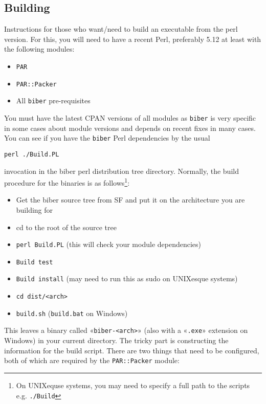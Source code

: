 \documentclass{ltxdockit}
\begin{document}
\subsection{Building}

Instructions for those who want/need to build an executable from the
perl version. For this, you will need to have a recent Perl,
preferably 5.12 at least with the following modules:

\begin{itemize}
\item \verb+PAR+
\item \verb+PAR::Packer+
\item All \verb+biber+ pre-requisites
\end{itemize}

\noindent You must have the latest CPAN versions of all modules as \verb+biber+
is very specific in some cases about module versions and depends on
recent fixes in many cases. You can see if you have the \verb+biber+
Perl dependencies by the usual

\begin{verbatim}
perl ./Build.PL
\end{verbatim}

\noindent invocation in the biber perl distribution tree
directory. Normally, the build procedure for the binaries is as
follows\footnote{On UNIXequse systems, you may need to specify a full
  path to the scripts e.g. \texttt{./Build}}:

\begin{itemize}
\item Get the biber source tree from SF and put it on the architecture
  you are building for
\item cd to the root of the source tree
\item \verb+perl Build.PL+ (this will check your module
  dependencies)
\item \verb+Build test+
\item \verb+Build install+ (may need to run this as sudo on
  UNIXesque systems)
\item \verb+cd dist/<arch>+
\item \verb+build.sh+ (\verb+build.bat+ on Windows)
\end{itemize}

\noindent This leaves a binary called «\verb+biber-<arch>+» (also with
a «\verb+.exe+» extension on Windows) in your current directory.
The tricky part is constructing the information for the build
script. There are two things that need to be configured, both of
which are required by the \verb+PAR::Packer+ module:
\end{document}
